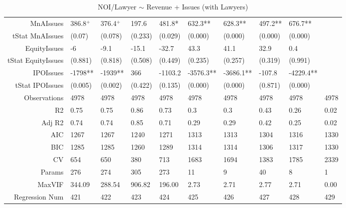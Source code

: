 \begin{table}[ht]
\begin{tabular}{rlllllllll}
  MnAIssues & 386.8$^{+}$ & 376.4$^{+}$ & 197.6 & 481.8* & 632.3** & 628.3** & 497.2** & 676.7** &  \\ 
  tStat MnAIssues & (0.07) & (0.078) & (0.233) & (0.029) & (0.000) & (0.000) & (0.000) & (0.000) &  \\ 
  EquityIssues & -6 & -9.1 & -15.1 & -32.7 & 43.3 & 41.1 & 32.9 & 0.4 &  \\ 
  tStat EquityIssues & (0.881) & (0.818) & (0.508) & (0.449) & (0.235) & (0.257) & (0.319) & (0.991) &  \\ 
  IPOIssues & -1798** & -1939** & 366 & -1103.2 & -3576.3** & -3686.1** & -107.8 & -4229.4** &  \\ 
  tStat IPOIssues & (0.005) & (0.002) & (0.422) & (0.135) & (0.000) & (0.000) & (0.871) & (0.000) &  \\ 
  Observations & 4978 & 4978 & 4978 & 4978 & 4978 & 4978 & 4978 & 4978 & 4978 \\ 
  R2 & 0.75 & 0.75 & 0.86 & 0.73 & 0.3 & 0.3 & 0.43 & 0.26 & 0.02 \\ 
  Adj R2 & 0.74 & 0.74 & 0.85 & 0.71 & 0.29 & 0.29 & 0.42 & 0.25 & 0.02 \\ 
  AIC & 1267 & 1267 & 1240 & 1271 & 1313 & 1313 & 1304 & 1316 & 1330 \\ 
  BIC & 1285 & 1285 & 1260 & 1289 & 1314 & 1314 & 1306 & 1317 & 1330 \\ 
  CV & 654 & 650 & 380 & 713 & 1683 & 1694 & 1383 & 1785 & 2339 \\ 
  Params & 276 & 274 & 305 & 273 & 11 & 9 & 40 & 8 & 1 \\ 
  MaxVIF & 344.09 & 288.54 & 906.82 & 196.00 & 2.73 & 2.71 & 2.77 & 2.71 & 0.00 \\ 
  Regression Num & 421 & 422 & 423 & 424 & 425 & 426 & 427 & 428 & 429 \\ 
   \hline
\end{tabular}
\caption{NOI/Lawyer $\sim$ Revenue + Issues (with Lawyers)} 
\end{table}
